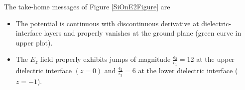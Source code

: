\documentclass[letterpaper]{article}
\renewcommand{\wt}{\widetilde}
\begin{document}
The take-home messages of Figure \ref{SiOnE2Figure} are 
\begin{itemize}
 \item The potential is continuous with discontinuous derivative
       at dielectric-interface layers and properly vanishes at 
       the ground plane (green curve in upper plot).
 \item The $E_z$ field properly exhibits jumps of magnitude
       $\frac{\epsilon_2}{\epsilon_1}=12$ at the upper dielectric 
       interface $(z=0)$ and 
       $\frac{\epsilon_2}{\epsilon_3}=6$ at the lower dielectric interface
       ($z=-1$).
\end{itemize}

%
%
\end{document}
